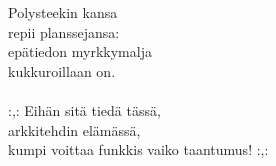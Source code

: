 
Polysteekin kansa \\ repii planssejansa: \\ epätiedon myrkkymalja \\ kukkuroillaan on. \\ \hspace{10mm} \\ :,: Eihän sitä tiedä tässä, \\ arkkitehdin elämässä, \\ kumpi voittaa funkkis vaiko taantumus! :,: